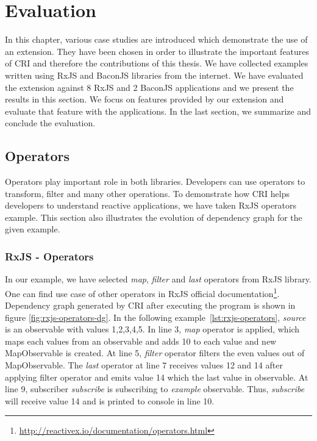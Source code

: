 \chapter{Evaluation} \label{chap:Evaluation}
In this chapter, various case studies are introduced which demonstrate the use of an extension. They have been chosen in order to illustrate the important features of CRI and therefore the contributions of this thesis. We have collected examples written using RxJS and BaconJS libraries from the internet. We have evaluated the extension against 8 RxJS and 2 BaconJS applications and we present the results in this section. We focus on features provided by our extension and evaluate that feature with the applications. In the last section, we summarize and conclude the evaluation.

\section{Operators}
Operators play important role in both libraries. Developers can use operators to transform, filter and many other operations. To demonstrate how CRI helps developers to understand reactive applications, we have taken RxJS operators example. This section also illustrates the evolution of dependency graph for the given example.

\subsection{RxJS - Operators}
In our example, we have selected \textit{map}, \textit{filter} and \textit{last} operators from RxJS library. One can find use case of other operators in RxJS official documentation\footnote{\url{http://reactivex.io/documentation/operators.html}}. Dependency graph generated by CRI after executing the program is shown in figure \ref{fig:rxjs-operators-dg}. In the following example~\ref{lst:rxjs-operators}, \textit{source} is an observable with values 1,2,3,4,5. In line 3, \textit{map} operator is applied, which maps each values from an observable and adds 10 to each value and new MapObservable is created. At line 5, \textit{filter} operator filters the even values out of MapObservable. The \textit{last} operator at line 7 receives values 12 and 14 after applying filter operator and emits value 14 which the last value in observable. At line 9, subscriber \textit{subscribe} is subscribing to \textit{example} observable. Thus, \textit{subscribe} will receive value 14 and is printed to console in line 10.

